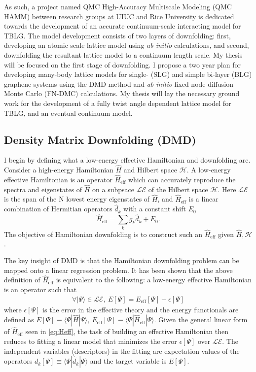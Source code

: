 \documentclass[12pt]{article}
\begin{document}
As such, a project named QMC High-Accuracy Multiscale Modeling (QMC HAMM) between research groups at UIUC and Rice University is dedicated towards the development of an accurate continuum-scale interacting model for TBLG.
The model development consists of two layers of downfolding: first, developing an atomic scale lattice model using \textit{ab initio} calculations, and second, downfolding the resultant lattice model to a continuum length scale.
My thesis will be focused on the first stage of downfolding.
I propose a two year plan for developing many-body lattice models for single- (SLG) and simple bi-layer (BLG) graphene systems using the DMD method and \textit{ab initio} fixed-node diffusion Monte Carlo (FN-DMC) calculations.
My thesis will lay the necessary ground work for the development of a fully twist angle dependent lattice model for TBLG, and an eventual continuum model.

\subsection{Density Matrix Downfolding (DMD)}
I begin by defining what a low-energy effective Hamiltonian and downfolding are.
Consider a high-energy Hamiltonian $\hat{H}$ and Hilbert space $\mathcal{H}$.
A low-energy effective Hamiltonian is an operator $\hat{H}_\text{eff}$ which can accurately reproduce the spectra and eigenstates of $\hat{H}$ on a subpsace $\mathcal{LE}$ of the Hilbert space $\mathcal{H}$.
Here $\mathcal{LE}$ is the span of the N lowest energy eigenstates of $\hat{H}$, and $\hat{H}_\text{eff}$ is a linear combination of Hermitian operators $\hat{d}_k$ with a constant shift $E_0$
\begin{equation}
\hat{H}_\text{eff} = \sum_{k} g_k \hat{d}_k  + E_0.
\label{eq:Heff}
\end{equation}
The objective of Hamiltonian downfolding is to construct such an $\hat{H}_\text{eff}$ given $\hat{H}, \mathcal{H}$.

The key insight of DMD is that the Hamiltonian downfolding problem can be mapped onto a linear regression problem.
It has been shown \cite{Zheng2017} that the above definition of $\hat{H}_\text{eff}$ is equivalent to the following: a low-energy effective Hamiltonian is an operator such that 
\begin{equation}
\begin{split}
\forall |\Psi\rangle \in \mathcal{LE},\ E[\Psi] = E_\text{eff}[\Psi]  + \epsilon[\Psi]
\end{split}
\label{eq:DMD}
\end{equation}
where $\epsilon[\Psi]$ is the error in the effective theory and the energy functionals are defined as $E[\Psi] \equiv \langle \Psi | \hat{H} |\Psi \rangle,\  E_\text{eff}[\Psi] \equiv \langle \Psi | \hat{H}_\text{eff} |\Psi \rangle$.
Given the general linear form of $\hat{H}_\text{eff}$ seen in \eqref{eq:Heff}, 
the task of building an effective Hamiltonian then reduces to fitting a linear model that minimizes the error $\epsilon[\Psi]$ over $\mathcal{LE}$.
The independent variables (descriptors) in the fitting are expectation values of the operators $d_k[\Psi] \equiv \langle \Psi |\hat{d}_k|\Psi \rangle$ and the target variable is $E[\Psi]$.
\end{document}
